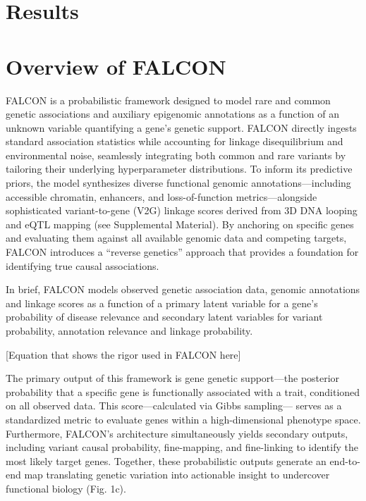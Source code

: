 \section{Results}
\label{sec:Results}

\section{Overview of FALCON}
\label{sec:falcon_overview}

FALCON is a probabilistic framework designed to model rare and common genetic associations and auxiliary epigenomic annotations as a function of an unknown variable quantifying a gene’s genetic support. FALCON directly ingests standard association statistics while accounting for linkage disequilibrium and environmental noise, seamlessly integrating both common and rare variants by tailoring their underlying hyperparameter distributions. To inform its predictive priors, the model synthesizes diverse functional genomic annotations—including accessible chromatin, enhancers, and loss-of-function metrics—alongside sophisticated variant-to-gene (V2G) linkage scores derived from 3D DNA looping and eQTL mapping (see Supplemental Material). By anchoring on specific genes and evaluating them against all available genomic data and competing targets, FALCON introduces a “reverse genetics” approach that provides a foundation for identifying true causal associations.

In brief, FALCON models observed genetic association data, genomic annotations and linkage scores as a function of a primary latent variable for a gene’s probability of disease relevance and secondary latent variables for variant probability, annotation relevance and linkage probability.

[Equation that shows the rigor used in FALCON here]

The primary output of this framework is gene genetic support—the posterior probability that a specific gene is functionally associated with a trait, conditioned on all observed data. This score—calculated via Gibbs sampling— serves as a standardized metric to evaluate genes within a high-dimensional phenotype space. Furthermore, FALCON’s architecture simultaneously yields secondary outputs, including variant causal probability, fine-mapping, and fine-linking to identify the most likely target genes. Together, these probabilistic outputs generate an end-to-end map translating genetic variation into actionable insight to undercover functional biology (Fig. 1c).

